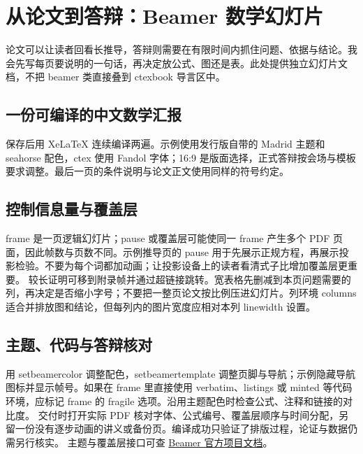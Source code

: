 \chapter{从论文到答辩：Beamer 数学幻灯片}\label{rev:latex:beamer}
论文可以让读者回看长推导，答辩则需要在有限时间内抓住问题、依据与结论。我会先写每页要说明的一句话，再决定放公式、图还是表。此处提供独立幻灯片文档，不把 beamer 类直接叠到 ctexbook 导言区中。

\section{一份可编译的中文数学汇报}
保存后用 XeLaTeX 连续编译两遍。示例使用发行版自带的 Madrid 主题和 seahorse 配色，ctex 使用 Fandol 字体；16:9 是版面选择，正式答辩按会场与模板要求调整。最后一页的条件说明与论文正文使用同样的符号约定。

\section{控制信息量与覆盖层}
frame 是一页逻辑幻灯片；pause 或覆盖层可能使同一 frame 产生多个 PDF 页面，因此帧数与页数不同。示例推导页的 pause 用于先展示正规方程，再展示投影检验。不要为每个词都加动画；让投影设备上的读者看清式子比增加覆盖层更重要。
较长证明可移到附录帧并通过超链接跳转。宽表格先删减到本页问题需要的列，再决定是否缩小字号；不要把一整页论文按比例压进幻灯片。列环境 columns 适合并排放图和结论，但每列内的图片宽度应相对本列 linewidth 设置。

\section{主题、代码与答辩核对}
用 setbeamercolor 调整配色，setbeamertemplate 调整页脚与导航；示例隐藏导航图标并显示帧号。如果在 frame 里直接使用 verbatim、listings 或 minted 等代码环境，应标记 frame 的 fragile 选项。沿用主题配色时检查公式、注释和链接的对比度。
交付时打开实际 PDF 核对字体、公式编号、覆盖层顺序与时间分配，另留一份没有逐步动画的讲义或备份页。编译成功只验证了排版过程，论证与数据仍需另行核实。
主题与覆盖层接口可查 \href{https://ctan.org/pkg/beamer}{Beamer 官方项目文档}。
